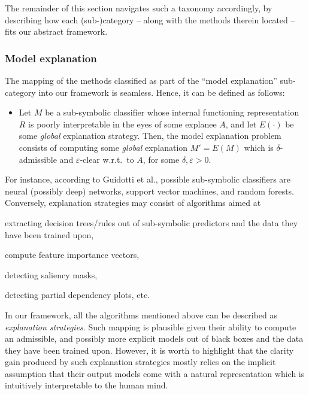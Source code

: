\documentclass[12pt,a4paper,openright,twoside]{book}
\begin{document}
The remainder of this section navigates such a taxonomy accordingly, by describing how each (sub-)category -- along with the methods therein located -- fits our abstract framework.

\subsubsection{Model explanation}

The mapping of the methods classified as part of the ``model explanation'' sub-category into our framework is seamless.
%
Hence, it can be defined as follows:
%
\begin{itemize}
    \item[] Let $M$ be a sub-symbolic classifier whose internal functioning representation $R$ is poorly interpretable in the eyes of some explanee $A$, and let $E(\cdot)$ be some \emph{global} explanation strategy.
    Then, the model explanation problem consists of computing some \emph{global} explanation $M' = E(M)$ which is $\delta$-admissible and $\varepsilon$-clear w.r.t.\ to $A$, for some $\delta, \varepsilon > 0$. 
\end{itemize}
%
For instance, according to Guidotti et al., possible sub-symbolic classifiers are neural (possibly deep) networks, support vector machines, and random forests.
%
Conversely, explanation strategies may consist of algorithms aimed at 
%
\begin{enumerate*}[label=\emph{(\roman{*})}]
    \item extracting decision trees/rules out of sub-symbolic predictors and the data they have been trained upon, 
    \item compute feature importance vectors,
    \item detecting saliency masks,
    \item detecting partial dependency plots, etc. 
\end{enumerate*}

In our framework, all the algorithms mentioned above can be described as \emph{explanation strategies}. 
%
Such mapping is plausible given their ability to compute an admissible, and possibly more explicit models out of black boxes and the data they have been trained upon.
%
However, it is worth to highlight that the clarity gain produced by such explanation strategies mostly relies on the implicit assumption that their output models come with a natural representation which is intuitively interpretable to the human mind.
\end{document}
